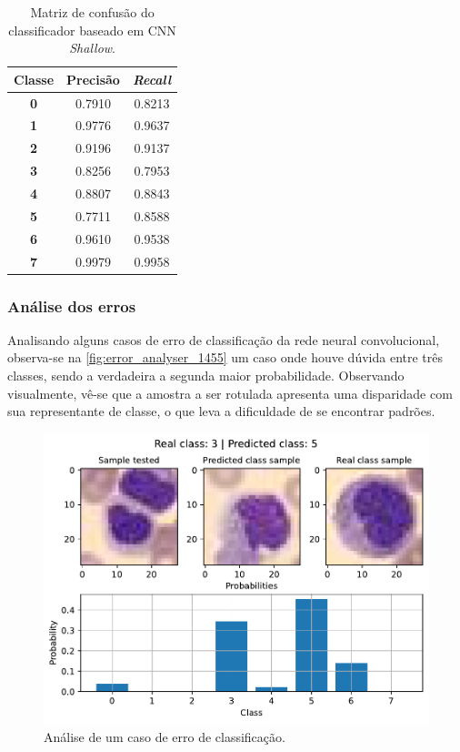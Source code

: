 \begin{table}[H]
	\centering
	\begin{tabular}{c|c|c}
		\textbf{Classe} & \textbf{Precisão} & \textit{\textbf{Recall}} \\ \hline
		\textbf{0}      & 0.7910            & 0.8213                   \\
		\textbf{1}      & 0.9776            & 0.9637                   \\
		\textbf{2}      & 0.9196            & 0.9137                   \\
		\textbf{3}      & 0.8256            & 0.7953                   \\
		\textbf{4}      & 0.8807            & 0.8843                   \\
		\textbf{5}      & 0.7711            & 0.8588                   \\
		\textbf{6}      & 0.9610            & 0.9538                   \\
		\textbf{7}      & 0.9979            & 0.9958                  
	\end{tabular}
	\caption{Matriz de confusão do classificador baseado em CNN \textit{Shallow}.}
	\label{tab:pr_CNN_shallow}
\end{table}

\subsubsection{Análise dos erros}

Analisando alguns casos de erro de classificação da rede neural convolucional, observa-se na \autoref{fig:error_analyser_1455} um caso onde houve dúvida entre três classes, sendo a verdadeira a segunda maior probabilidade. Observando visualmente, vê-se que a amostra a ser rotulada apresenta uma disparidade com sua representante de classe, o que leva a dificuldade de se encontrar padrões.

\begin{figure}[H]
\centering
\includegraphics[width=0.75\linewidth]{../../plot/cnn_shallow/error_analyser_1455}
\caption{Análise de um caso de erro de classificação.}
\label{fig:error_analyser_1455}
\end{figure}

